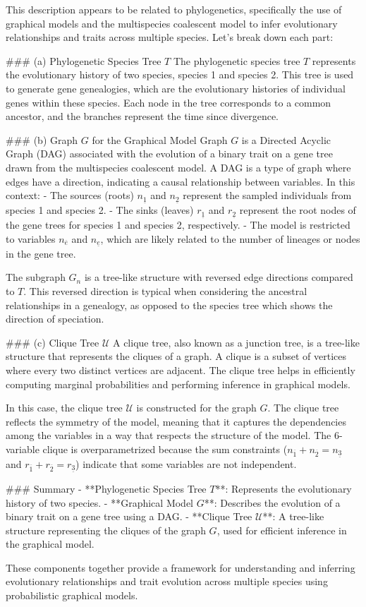 This description appears to be related to phylogenetics, specifically the use of graphical models and the multispecies coalescent model to infer evolutionary relationships and traits across multiple species. Let's break down each part:

### (a) Phylogenetic Species Tree \( T \)
The phylogenetic species tree \( T \) represents the evolutionary history of two species, species 1 and species 2. This tree is used to generate gene genealogies, which are the evolutionary histories of individual genes within these species. Each node in the tree corresponds to a common ancestor, and the branches represent the time since divergence.

### (b) Graph \( G \) for the Graphical Model
Graph \( G \) is a Directed Acyclic Graph (DAG) associated with the evolution of a binary trait on a gene tree drawn from the multispecies coalescent model. A DAG is a type of graph where edges have a direction, indicating a causal relationship between variables. In this context:
- The sources (roots) \( n_{\underline{1}} \) and \( n_{\underline{2}} \) represent the sampled individuals from species 1 and species 2.
- The sinks (leaves) \( r_{\underline{1}} \) and \( r_{\underline{2}} \) represent the root nodes of the gene trees for species 1 and species 2, respectively.
- The model is restricted to variables \( n_{\overline{e}} \) and \( n_{\underline{e}} \), which are likely related to the number of lineages or nodes in the gene tree.

The subgraph \( G_n \) is a tree-like structure with reversed edge directions compared to \( T \). This reversed direction is typical when considering the ancestral relationships in a genealogy, as opposed to the species tree which shows the direction of speciation.

### (c) Clique Tree \( \mathcal{U} \)
A clique tree, also known as a junction tree, is a tree-like structure that represents the cliques of a graph. A clique is a subset of vertices where every two distinct vertices are adjacent. The clique tree helps in efficiently computing marginal probabilities and performing inference in graphical models.

In this case, the clique tree \( \mathcal{U} \) is constructed for the graph \( G \). The clique tree reflects the symmetry of the model, meaning that it captures the dependencies among the variables in a way that respects the structure of the model. The 6-variable clique is overparametrized because the sum constraints (\( n_{\overline{1}} + n_{\overline{2}} = n_{\underline{3}} \) and \( r_{\overline{1}} + r_{\overline{2}} = r_{\underline{3}} \)) indicate that some variables are not independent.

### Summary
- **Phylogenetic Species Tree \( T \)**: Represents the evolutionary history of two species.
- **Graphical Model \( G \)**: Describes the evolution of a binary trait on a gene tree using a DAG.
- **Clique Tree \( \mathcal{U} \)**: A tree-like structure representing the cliques of the graph \( G \), used for efficient inference in the graphical model.

These components together provide a framework for understanding and inferring evolutionary relationships and trait evolution across multiple species using probabilistic graphical models.